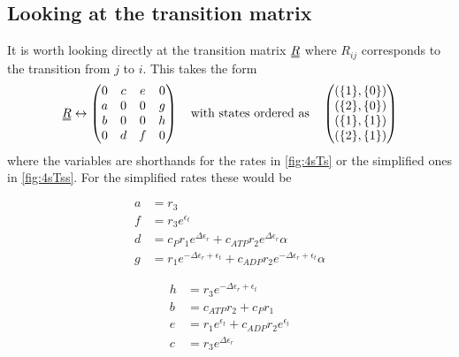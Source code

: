 \documentclass[11pt]{article}
\newcommand\set[1]{\ensuremath{\{#1\}}}
\newcommand{\duf}[2]{\stackunder[0.5pt]{\stackunder[0.8pt]{\stackunder[1pt]{\ensuremath{#1}}{\rule{\widthof{\ensuremath{#2}}*\real{0.9}}{.1ex}}}{\rule{\widthof{\ensuremath{#2}}*\real{0.9}}{.1ex}}}{}}
\newcommand{\du}[1]{\duf{#1}{#1}}
\begin{document}
\subsection{Looking at the transition matrix}
It is worth looking directly at the transition matrix $\du{R}$ where $R_{ij}$ corresponds to the transition from $j$ to $i$.
This takes the form
\begin{align}
    \du{R} \leftrightarrow \begin{pmatrix}
    0 & c & e & 0 \\
    a & 0 & 0 & g \\
    b & 0 & 0 & h \\
    0 & d & f & 0 \\
    \end{pmatrix} \qq{with states ordered as} \begin{pmatrix}
        (\set{1}, \set{0}) \\
        (\set{2}, \set{0}) \\
        (\set{1}, \set{1}) \\
        (\set{2}, \set{1})
    \end{pmatrix}
\end{align}
where the variables are shorthands for the rates in \cref{fig:4sTs} or the simplified ones in \cref{fig:4sTss}.
For the simplified rates these would be

\begin{minipage}{0.45\textwidth}
    \begin{align}
        a &= r_3 \\
        f &= r_3 e^{\epsilon_{t}} \\
        d &= c_P r_1 e^{\Delta\epsilon_{r}} + c_{ATP} r_2 e^{\Delta\epsilon_{r}} \alpha \\
        g &= r_1 e^{ - \Delta\epsilon_{r} + \epsilon_{t}} + c_{ADP} r_2 e^{ - \Delta\epsilon_{r} + \epsilon_{t}} \alpha
    \end{align}
\end{minipage}
\begin{minipage}{0.45\textwidth}
    \begin{align}
        h &= r_3 e^{ - \Delta\epsilon_{r} + \epsilon_{t}} \\
        b &= c_{ATP} r_2 + c_P r_1 \\
        e &= r_1 e^{\epsilon_{t}} + c_{ADP} r_2 e^{\epsilon_{t}} \\
        c &= r_3 e^{\Delta\epsilon_{r}}
    \end{align}
\end{minipage}
\end{document}
